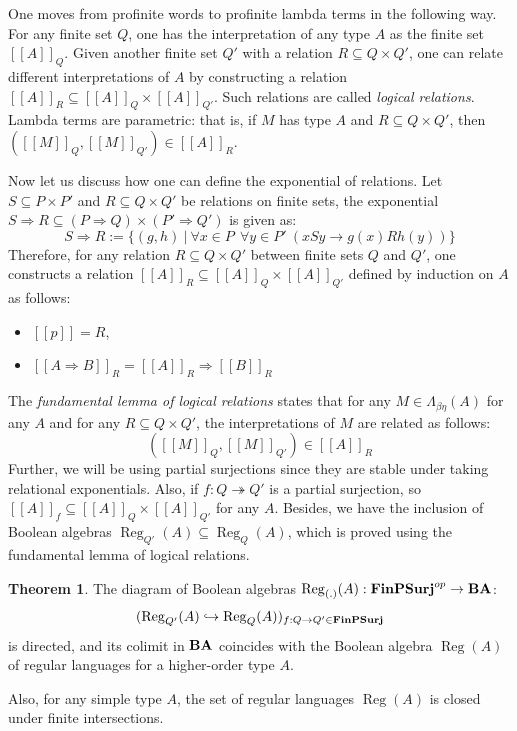 \documentclass[8pt]{article}
\theoremstyle{definition}
\theoremstyle{definition}
\newtheorem{theorem}{Theorem}[section]
\theoremstyle{definition}
\theoremstyle{definition}
\theoremstyle{definition}
\theoremstyle{definition}
\theoremstyle{definition}
\theoremstyle{definition}
\theoremstyle{definition}
\theoremstyle{definition}
\theoremstyle{definition}
\theoremstyle{definition}
\theoremstyle{definition}
\theoremstyle{definition}
\theoremstyle{question}
\begin{document}
One moves from profinite words to profinite lambda terms in the following way. For any finite set $Q$, one has the interpretation
of any type $A$ as the finite set $[\![A]\!]_Q$. Given another finite set $Q'$ with a relation $R \subseteq Q \times Q'$, 
one can relate different interpretations of $A$ by constructing a relation $[\![A]\!]_R \subseteq [\![A]\!]_Q \times [\![A]\!]_{Q'}$.
Such relations are called \emph{logical relations}. Lambda terms are parametric: that is, if $M$ has type $A$ and $R \subseteq Q \times Q'$,
then $([\![M]\!]_Q, [\![M]\!]_{Q'}) \in [\![A]\!]_R$.

Now let us discuss how one can define the exponential of relations. Let $S \subseteq P \times P'$ and
$R \subseteq Q \times Q'$ be relations on finite sets, the exponential $S \Rightarrow R \subseteq (P \Rightarrow Q) \times (P' 
\Rightarrow Q')$ is given as:
\[
S \Rightarrow R := \{ (g,h) \: | \: \forall x \in P \:\: \forall y \in P' \: (x S y \to g(x) R h(y))\}
\]
Therefore, for any relation $R \subseteq Q \times Q'$ between finite sets $Q$ and $Q'$, one constructs a relation
$[\![A]\!]_R \subseteq [\![A]\!]_Q \times [\![A]\!]_{Q'}$ defined by induction on $A$ as follows:
\begin{itemize}
  \item $[\![p]\!] = R$,
  \item $[\![A \Rightarrow B]\!]_R = [\![A]\!]_R \Rightarrow [\![B]\!]_R$
\end{itemize}
The \emph{fundamental lemma of logical relations} states that for any $M \in \Lambda_{\beta\eta}(A)$ for any $A$
and for any $R \subseteq Q \times Q'$, the interpretations of $M$ are related as follows: 
\[
([\![M]\!]_Q, [\![M]\!]_{Q'}) \in [\![A]\!]_R
\]
Further, we will be using partial surjections since they are stable under taking relational exponentials. Also,
if $f : Q \twoheadrightarrow Q'$ is a partial surjection, so $[\![A]\!]_f \subseteq [\![A]\!]_Q \times [\![A]\!]_{Q'}$
for any $A$. Besides, we have the inclusion of Boolean algebras $\operatorname{Reg}_{Q'}(A) \subseteq \operatorname{Reg}_Q(A)$,
which is proved using the fundamental lemma of logical relations.

\begin{theorem}
  The diagram of Boolean algebras $\operatorname{Reg}_{(.)}(A) : {\bf FinPSurj}^{op} \to {\bf BA}$:
  \[
  (\operatorname{Reg}_{Q'}(A) \hookrightarrow \operatorname{Reg}_{Q}(A))_{f : Q \to Q' \in {\bf FinPSurj}}
  \]
  is directed, and its colimit in ${\bf BA}$ coincides with the Boolean algebra $\operatorname{Reg}(A)$
  of regular languages for a higher-order type $A$. 
\end{theorem}
Also, for any simple type $A$, the set of regular languages $\operatorname{Reg}(A)$ is closed under finite intersections.
\end{document}
